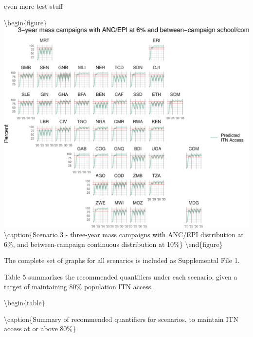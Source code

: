 \documentclass[review,
3p]{elsarticle} %
\begin{document}
even more test stuff

\textbackslash begin\{figure\}
\includegraphics[width=0.8\linewidth]{quant_paper_files/figure-latex/geo_facets_cducc-1}
\textbackslash caption\{\label{geo_facets_cducc}Scenario 3 - three-year
mass campaigns with ANC/EPI distribution at 6\%, and between-campaign
continuous distribution at 10\%\}\label{fig:geo_facets_cducc}
\textbackslash end\{figure\}

The complete set of graphs for all scenarios is included as Supplemental
File 1.

Table 5 summarizes the recommended quantifiers under each scenario,
given a target of maintaining 80\% population ITN access.

\textbackslash begin\{table\}

\textbackslash caption\{\label{tab:kable_table80}Summary of recommended
quantifiers for scenarios, to maintain ITN access at or above 80\%\}
\centering
\end{document}
